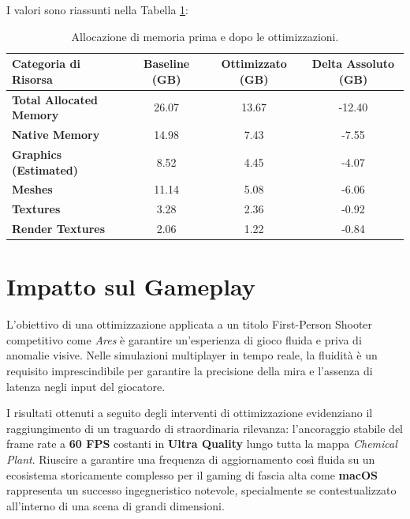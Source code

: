 I valori sono riassunti nella Tabella \ref{tab:final_memory_comparison}:

\begin{table}[H]
    \centering
    \caption{Allocazione di memoria prima e dopo le ottimizzazioni.}
    \label{tab:final_memory_comparison}
    \begin{tabular}{l|c|c|c}
        \hline
        \textbf{Categoria di Risorsa} & \textbf{Baseline (GB)} & \textbf{Ottimizzato (GB)} & \textbf{Delta Assoluto (GB)} \\ \hline
        \textbf{Total Allocated Memory} & 26.07                 & 13.67                     & -12.40 \\
        \textbf{Native Memory}          & 14.98                 & 7.43                      & -7.55  \\
        \textbf{Graphics (Estimated)}   & 8.52                  & 4.45                      & -4.07  \\ \hline
        \textbf{Meshes}                 & 11.14                 & 5.08                      & -6.06  \\
        \textbf{Textures}               & 3.28                  & 2.36                      & -0.92  \\
        \textbf{Render Textures}        & 2.06                  & 1.22                      & -0.84  \\ \hline
    \end{tabular}
\end{table}

\section{Impatto sul Gameplay}
L'obiettivo di una ottimizzazione applicata a un titolo First-Person Shooter competitivo come \textit{Ares} è garantire un'esperienza di gioco fluida e priva di anomalie visive. Nelle simulazioni multiplayer in tempo reale, la fluidità è un requisito imprescindibile per garantire la precisione della mira e l'assenza di latenza negli input del giocatore.

I risultati ottenuti a seguito degli interventi di ottimizzazione evidenziano il raggiungimento di un traguardo di straordinaria rilevanza: l'ancoraggio stabile del frame rate a \textbf{60 FPS} costanti in \textbf{Ultra Quality} lungo tutta la mappa \textit{Chemical Plant}. Riuscire a garantire una frequenza di aggiornamento così fluida su un ecosistema storicamente complesso per il gaming di fascia alta come \textbf{macOS} rappresenta un successo ingegneristico notevole, specialmente se contestualizzato all'interno di una scena di grandi dimensioni.

